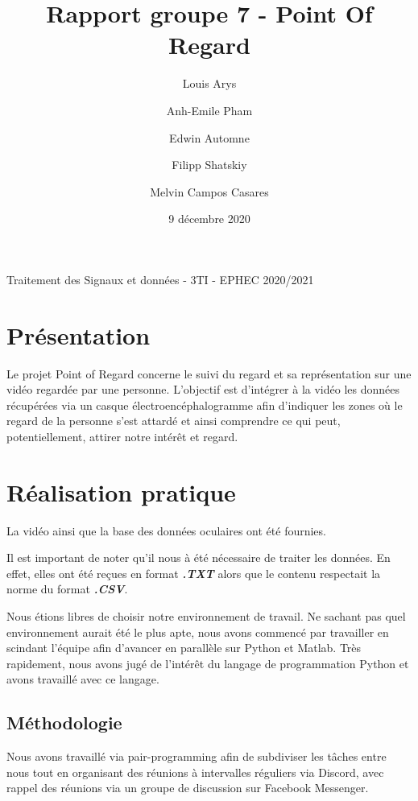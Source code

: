 \documentclass[12pt]{article}
\title{Rapport groupe 7 - Point Of Regard}
\author{Louis Arys \and Anh-Emile Pham \and Edwin Automne \and Filipp Shatskiy \and Melvin Campos Casares}
\date{9 décembre 2020}
\begin{document}
\maketitle

\begin{center}
Traitement des Signaux et données - 3TI - EPHEC 2020/2021
\end{center}

\tableofcontents

\newpage

\section{Présentation}

Le projet Point of Regard concerne le suivi du regard et sa représentation sur une vidéo regardée par une personne.
L'objectif est d'intégrer à la vidéo les données récupérées via un casque électroencéphalogramme afin d'indiquer les zones où le regard de la personne s'est attardé et ainsi comprendre ce qui peut, potentiellement, attirer notre intérêt et regard.

\section{Réalisation pratique}

La vidéo ainsi que la base des données oculaires ont été fournies.

\hspace{0.3cm}

Il est important de noter qu'il nous à été nécessaire de traiter les données.
En effet, elles ont été reçues en format \textbf{\textit{.TXT}} alors que le contenu respectait la norme du format \textbf{\textit{.CSV}}.

\hspace{0.3cm}

Nous étions libres de choisir notre environnement de travail. Ne sachant pas quel environnement aurait été le plus apte, nous avons commencé par travailler en scindant l'équipe afin d'avancer en parallèle sur Python et Matlab. Très rapidement, nous avons jugé de l'intérêt du langage de programmation Python et avons travaillé avec ce langage.

\subsection{Méthodologie}

Nous avons travaillé via pair-programming afin de subdiviser les tâches entre nous tout en organisant des réunions à intervalles réguliers via Discord, avec rappel des réunions via un groupe de discussion sur Facebook Messenger.
\end{document}
